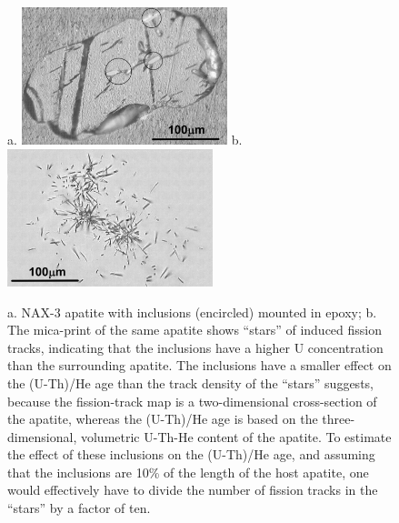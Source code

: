 \documentclass{article}
\begin{document}
\begin{figure}[htbp]
  \centering
a. \includegraphics[height=4cm]{FTmount1gray.jpg}
b. \includegraphics[height=4cm]{FTprint1gray.jpg}
  \caption{
a. NAX-3 apatite with inclusions (encircled) mounted in epoxy; b.  The
mica-print  of the  same apatite  shows ``stars''  of  induced fission
tracks, indicating  that the inclusions have a  higher U concentration
than the surrounding apatite. The  inclusions have a smaller effect on
the (U-Th)/He  age than the  track density of the  ``stars'' suggests,
because the  fission-track map  is a two-dimensional  cross-section of
the   apatite,   whereas  the   (U-Th)/He   age   is   based  on   the
three-dimensional,  volumetric  U-Th-He content  of  the apatite.   To
estimate  the effect  of these  inclusions on  the (U-Th)/He  age, and
assuming  that the  inclusions  are 10\%  of  the length  of the  host
apatite, one  would effectively have  to divide the number  of fission
tracks in the ``stars'' by a factor of ten.}
  \label{fig:FTmount&print}
\end{figure}
\end{document}
